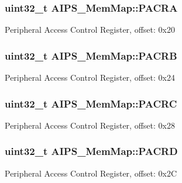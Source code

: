 \subsubsection[{P\+A\+C\+R\+A}]{\setlength{\rightskip}{0pt plus 5cm}uint32\+\_\+t A\+I\+P\+S\+\_\+\+Mem\+Map\+::\+P\+A\+C\+R\+A}\label{struct_a_i_p_s___mem_map_a4b1afda7928f39099d6cc26a0b17da11}
Peripheral Access Control Register, offset\+: 0x20 \hypertarget{struct_a_i_p_s___mem_map_aa6897cc68c3e0e6bff51c421049ba3f4}{}
\subsubsection[{P\+A\+C\+R\+B}]{\setlength{\rightskip}{0pt plus 5cm}uint32\+\_\+t A\+I\+P\+S\+\_\+\+Mem\+Map\+::\+P\+A\+C\+R\+B}\label{struct_a_i_p_s___mem_map_aa6897cc68c3e0e6bff51c421049ba3f4}
Peripheral Access Control Register, offset\+: 0x24 \hypertarget{struct_a_i_p_s___mem_map_acbd09d77313ec522210dbcabec37c9f5}{}
\subsubsection[{P\+A\+C\+R\+C}]{\setlength{\rightskip}{0pt plus 5cm}uint32\+\_\+t A\+I\+P\+S\+\_\+\+Mem\+Map\+::\+P\+A\+C\+R\+C}\label{struct_a_i_p_s___mem_map_acbd09d77313ec522210dbcabec37c9f5}
Peripheral Access Control Register, offset\+: 0x28 \hypertarget{struct_a_i_p_s___mem_map_a98bd3ff2455e9fccb9cd7d06cc090370}{}
\subsubsection[{P\+A\+C\+R\+D}]{\setlength{\rightskip}{0pt plus 5cm}uint32\+\_\+t A\+I\+P\+S\+\_\+\+Mem\+Map\+::\+P\+A\+C\+R\+D}\label{struct_a_i_p_s___mem_map_a98bd3ff2455e9fccb9cd7d06cc090370}
Peripheral Access Control Register, offset\+: 0x2\+C \hypertarget{struct_a_i_p_s___mem_map_ad1f2d4b98aea7609a045558a9dc20f7b}{}
